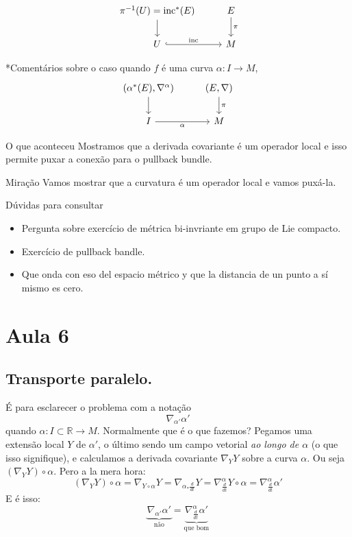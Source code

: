 \begin{example}\leavevmode
\[\begin{tikzcd}
	\pi^{-1}(U)=\text{inc}^* (E)\arrow[d]&E\arrow[d,"\pi"]\\
	U\arrow[r,hook,"\text{inc}"]&M
\end{tikzcd}\]
\end{example}
\begin{remark}\leavevmode
*Comentários sobre o caso quando \(f\) é uma curva \(\alpha:I \to M\),
\[\begin{tikzcd}
	(\alpha ^* (E),\nabla^\alpha)\arrow[d]& (E,\nabla)\arrow[d,"\pi"]\\I\arrow[r,"\alpha",swap]&M
\end{tikzcd}\]
\end{remark}

\begin{thing8}{O que aconteceu}\leavevmode
Mostramos que a derivada covariante é um operador local e isso permite puxar a conexão para o pullback bundle.
\end{thing8}

\begin{thing9}{Miração}\leavevmode
Vamos mostrar que a curvatura é um operador local e vamos puxá-la.
\end{thing9}

\begin{thing8}{Dúvidas para consultar}\leavevmode
\begin{itemize}
\item Pergunta sobre exercício de métrica bi-invriante em grupo de Lie compacto.
\item Exercício de pullback bandle.
\item Que onda con eso del espacio métrico y que la distancia de un punto a sí mismo es cero.
\end{itemize}
\end{thing8}


\section{Aula 6}

\subsection{Transporte paralelo.}

\begin{remark}\leavevmode
É para esclarecer o problema com a notação
\[\nabla_{\alpha'}\alpha'\]
quando \(\alpha:I \subset \mathbb{R} \to M\). Normalmente que é o que fazemos? Pegamos uma extensão local \(Y\) de \(\alpha'\), o último sendo um campo vetorial \textit{ao longo de \(\alpha\)} (o que isso signifique), e calculamos a derivada covariante \(\nabla_YY\) sobre a curva \(\alpha\). Ou seja \((\nabla_YY)\circ\alpha\). Pero a la mera hora:
\[(\nabla_YY)\circ \alpha=\nabla_{Y\circ\alpha}Y=\nabla_{\alpha_*\frac{d}{dt}}Y=\nabla^\alpha_{\frac{d}{dt}}Y \circ \alpha=\nabla^\alpha_{\frac{d}{dt}}\alpha'\]
E é isso:
\[\underbrace{\nabla_{\alpha'}\alpha'}_{\text{não} }=\underbrace{\nabla^\alpha_{\frac{d}{dt}}\alpha'}_{\text{que bom} }\]
\end{remark}


